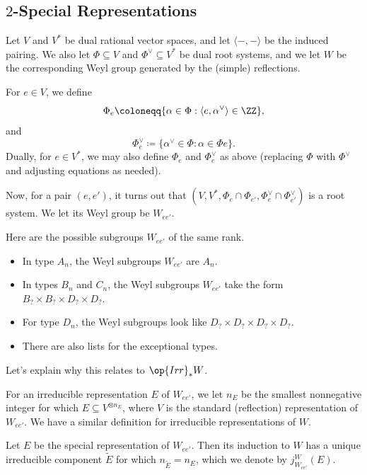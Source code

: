 \documentclass[../notes.tex]{subfiles}
\begin{document}
\subsection{\texorpdfstring{$2$}{2}-Special Representations}
Let $V$ and $V^*$ be dual rational vector spaces, and let $\langle-,-\rangle$ be the induced pairing. We also let $\Phi\subseteq V$ and $\Phi^\lor\subseteq V^*$ be dual root systems, and we let $W$ be the corresponding Weyl group generated by the (simple) reflections.
\begin{notation}
	For $e\in V$, we define
	\[\Phi_e\coloneqq\{\alpha\in\Phi:\langle e,\alpha^\lor\rangle\in\ZZ\},\]
	and
	\[\Phi^\lor_e\coloneqq\{\alpha^\lor\in\Phi:\alpha\in\Phi e\}.\]
	Dually, for $e\in V^*$, we may also define $\Phi_e$ and $\Phi^\lor_e$ as above (replacing $\Phi$ with $\Phi^\lor$ and adjusting equations as needed).
\end{notation}
\begin{remark}
	Now, for a pair $(e,e')$, it turns out that $(V,V^*,\Phi_e\cap\Phi_{e'},\Phi^\lor_e\cap\Phi^\lor_{e'})$ is a root system. We let its Weyl group be $W_{ee'}$.
\end{remark}
\begin{example}
	Here are the possible subgroups $W_{ee'}$ of the same rank.
	\begin{itemize}
		\item In type $A_n$, the Weyl subgroups $W_{ee'}$ are $A_n$.
		\item In types $B_n$ and $C_n$, the Weyl subgroups $W_{ee'}$ take the form $B_?\times B_?\times D_?\times D_?$.
		\item For type $D_n$, the Weyl subgroups look like $D_?\times D_?\times D_?\times D_?$.
		\item There are also lists for the exceptional types.
	\end{itemize}
\end{example}
Let's explain why this relates to $\op{Irr}_*W$.
\begin{notation}
	For an irreducible representation $E$ of $W_{ee'}$, we let $n_E$ be the smallest nonnegative integer for which $E\subseteq V^{\otimes n_E}$, where $V$ is the standard (reflection) representation of $W_{ee'}$. We have a similar definition for irreducible representations of $W$.
\end{notation}
\begin{notation}
	Let $E$ be the special representation of $W_{ee'}$. Then its induction to $W$ has a unique irreducible component $\widetilde E$ for which $n_{\widetilde E}=n_E$, which we denote by $j^W_{W_{ee'}}(E)$.
\end{notation}
\end{document}
